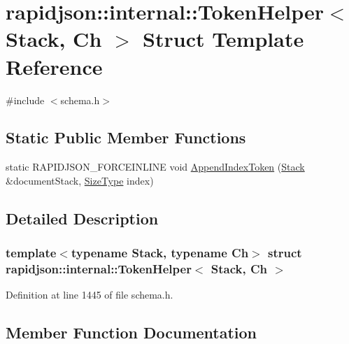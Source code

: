 \hypertarget{structrapidjson_1_1internal_1_1_token_helper}{}\section{rapidjson\+::internal\+::Token\+Helper$<$ Stack, Ch $>$ Struct Template Reference}
\label{structrapidjson_1_1internal_1_1_token_helper}


{\ttfamily \#include $<$schema.\+h$>$}

\subsection*{Static Public Member Functions}
\begin{DoxyCompactItemize}
\item 
static R\+A\+P\+I\+D\+J\+S\+O\+N\+\_\+\+F\+O\+R\+C\+E\+I\+N\+L\+I\+NE void \mbox{\hyperlink{structrapidjson_1_1internal_1_1_token_helper_a633523ce836cb5711fef98301ab6d8f7}{Append\+Index\+Token}} (\mbox{\hyperlink{classrapidjson_1_1internal_1_1_stack}{Stack}} \&document\+Stack, \mbox{\hyperlink{namespacerapidjson_a44eb33eaa523e36d466b1ced64b85c84}{Size\+Type}} index)
\end{DoxyCompactItemize}


\subsection{Detailed Description}
\subsubsection*{template$<$typename Stack, typename Ch$>$\newline
struct rapidjson\+::internal\+::\+Token\+Helper$<$ Stack, Ch $>$}



Definition at line 1445 of file schema.\+h.



\subsection{Member Function Documentation}
\mbox{\label{structrapidjson_1_1internal_1_1_token_helper_a633523ce836cb5711fef98301ab6d8f7}} 
